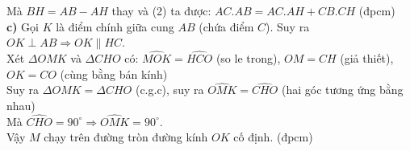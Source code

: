 \begin{ex}
{Mà $BH=AB-AH$ thay và (2) ta được: $AC.AB=AC.AH+CB.CH$ (đpcm)\\
\textbf{c)} Gọi $K$ là điểm chính giữa cung $AB$ (chứa điểm $C$). Suy ra $OK\perp AB\Rightarrow OK\parallel HC$.\\
Xét $\Delta OMK$ và $\Delta CHO$ có: $\widehat{MOK}=\widehat{HCO}$ (so le trong), $OM=CH$ (giả thiết), $OK=CO$ (cùng bằng bán kính)\\
Suy ra $\Delta OMK=\Delta CHO$ (c.g.c), suy ra $\widehat{OMK}=\widehat{CHO}$ (hai góc tương ứng bằng nhau)\\
Mà $\widehat{CHO}=90^\circ\Rightarrow \widehat{OMK}=90^\circ$.\\
Vậy $M$ chạy trên đường tròn đường kính $OK$ cố định. (đpcm)
}
\end{ex}
